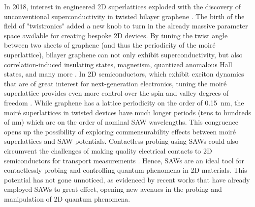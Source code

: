 \documentclass[double,12pt,1in]{beavtex}
\begin{document}
In 2018, interest in engineered 2D superlattices exploded with the discovery of unconventional superconductivity in twisted bilayer graphene \cite{cao_unconventional_2018}. The birth of the field of "twistronics" added a new knob to turn in the already massive parameter space available for creating bespoke 2D devices. By tuning the twist angle between two sheets of graphene (and thus the periodicity of the moiré superlattice), bilayer graphene can not only exhibit superconductivity, but also correlation-induced insulating states, magnetism, quantized anomalous Hall states, and many more \cite{andrei_graphene_2020}. In 2D semiconductors, which exhibit exciton dynamics that are of great interest for next-generation electronics, tuning the moiré superlattice provides even more control over the spin and valley degrees of freedom \cite{ciarrocchi_excitonic_2022}. While graphene has a lattice periodicity on the order of \SI{0.15}{\nano\meter}, the moiré superlattices in twisted devices have much longer periods (tens to hundreds of nm) which are on the order of nominal SAW wavelengths. This congruence opens up the possibility of exploring commensurability effects between moiré superlattices and SAW potentials. Contactless probing using SAWs could also circumvent the challenges of making quality electrical contacts to 2D semiconductors for transport measurements \cite{miao_recent_2022}. Hence, SAWs are an ideal tool for contactlessly probing and controlling quantum phenomena in 2D materials. This potential has not gone unnoticed, as evidenced by recent works that have already employed SAWs to great effect, opening new avenues in the probing and manipulation of 2D quantum phenomena.
\end{document}
